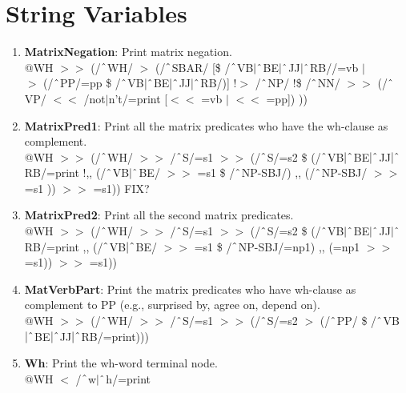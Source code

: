 \section{String Variables}
\begin{enumerate}
    \item \textbf{MatrixNegation}: Print matrix negation. \\
    @WH $>\!\!>$ (/$\string^$WH/ $>$ (/$\string^$SBAR/ [\$ /$\string^$VB$|\string^$BE$|\string^$JJ$|\string^$RB//=vb $|$ \\
    $>$ (/$\string^$PP/=pp \$ /$\string^$VB$|\string^$BE$|\string^$JJ$|\string^$RB/)] !$>$ /$\string^$NP/ !\$ /$\string^$NN/ $>\!\!>$ (/$\string^$VP/ $<\!\!<$ /not$|$n't/=print [$<\!\!<$ =vb $|$ $<\!\!<$ =pp]) ))

    
    \item \textbf{MatrixPred1}: Print all the matrix predicates who have the wh-clause as complement.\\
    @WH $>\!\!>$ (/$\string^$WH/ $>\!\!>$ /$\string^$S/=s1 $>\!\!>$ (/$\string^$S/=s2 \$ (/$\string^$VB$|\string^$BE$|\string^$JJ$|\string^$RB/=print !,, (/$\string^$VB$|\string^$BE/ $>\!\!>$ =s1 \$ /$\string^$NP-SBJ/) ,, (/$\string^$NP-SBJ/ $>\!\!>$ =s1 )) $>\!\!>$ =s1))
    \color{red}
    FIX?
    \color{black}

    \item \textbf{MatrixPred2}: Print all the second matrix predicates.\\
    @WH $>\!\!>$ (/$\string^$WH/ $>\!\!>$ /$\string^$S/=s1 $>\!\!>$ (/$\string^$S/=s2 \$ (/$\string^$VB$|\string^$BE$|\string^$JJ$|\string^$RB/=print ,, (/$\string^$VB$|\string^$BE/ $>\!\!>$ =s1 \$ /$\string^$NP-SBJ/=np1) ,, (=np1 $>\!\!>$ =s1)) $>\!\!>$ =s1))


    \item \textbf{MatVerbPart}: Print the matrix predicates who have wh-clause as complement to PP (e.g., \textsf{surprised by}, \textsf{agree on}, \textsf{depend on}).\\
    @WH $>\!\!>$ (/$\string^$WH/ $>\!\!>$ /$\string^$S/=s1 $>\!\!>$ (/$\string^$S/=s2 $>$ (/$\string^$PP/ \$ /$\string^$VB$|\string^$BE$|\string^$JJ$|\string^$RB/=print)))


    \item \textbf{Wh}: Print the wh-word terminal node.\\
    @WH $<$ /$\string^$w$|\string^$h/=print


\end{enumerate}
